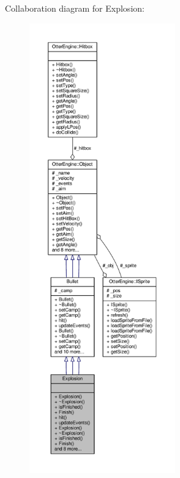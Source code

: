 Collaboration diagram for Explosion\+:\nopagebreak
\begin{figure}[H]
\begin{center}
\leavevmode
\includegraphics[height=550pt]{d8/d33/class_explosion__coll__graph}
\end{center}
\end{figure}
